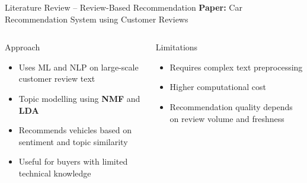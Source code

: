 \documentclass[aspectratio=169]{beamer}
\begin{document}
\begin{frame}{Literature Review -- Review-Based Recommendation}
  \textbf{Paper:} Car Recommendation System using Customer Reviews
  \vspace{0.5em}
  \begin{columns}[t]
      \begin{block}{Approach}
        \begin{itemize}
          \item Uses ML and NLP on large-scale customer review text
          \item Topic modelling using \textbf{NMF} and \textbf{LDA}
          \item Recommends vehicles based on sentiment and topic similarity
          \item Useful for buyers with limited technical knowledge
        \end{itemize}
      \end{block}
      \begin{alertblock}{Limitations}
        \begin{itemize}
          \item Requires complex text preprocessing
          \item Higher computational cost
          \item Recommendation quality depends on review volume and freshness
        \end{itemize}
      \end{alertblock}
  \end{columns}
\end{frame}
\end{document}

